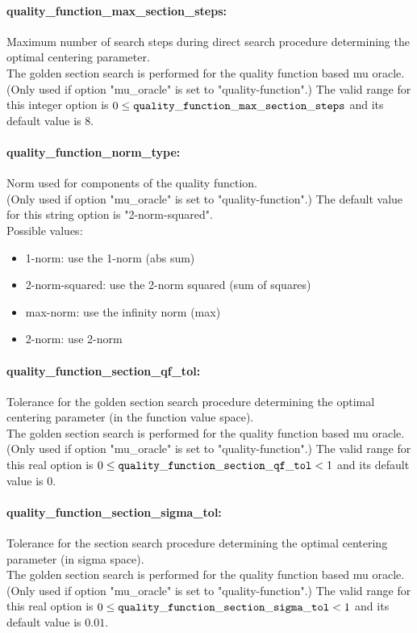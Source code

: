 \paragraph{quality\_function\_max\_section\_steps:}\label{sec:quality_function_max_section_steps} Maximum number of search steps during direct search procedure determining the optimal centering parameter. $\;$ \\
 The golden section search is performed for the
quality function based mu oracle. (Only used if
option "mu\_oracle" is set to "quality-function".) The valid range for this integer option is
$0 \le {\tt quality\_function\_max\_section\_steps }$
and its default value is $8$.


\paragraph{quality\_function\_norm\_type:}\label{sec:quality_function_norm_type} Norm used for components of the quality function. $\;$ \\
 (Only used if option "mu\_oracle" is set to
"quality-function".)
The default value for this string option is "2-norm-squared".
\\ 
Possible values:
\begin{itemize}
   \item 1-norm: use the 1-norm (abs sum)
   \item 2-norm-squared: use the 2-norm squared (sum of squares)
   \item max-norm: use the infinity norm (max)
   \item 2-norm: use 2-norm
\end{itemize}

\paragraph{quality\_function\_section\_qf\_tol:}\label{sec:quality_function_section_qf_tol} Tolerance for the golden section search procedure determining the optimal centering parameter (in the function value space). $\;$ \\
 The golden section search is performed for the
quality function based mu oracle. (Only used if
option "mu\_oracle" is set to "quality-function".) The valid range for this real option is 
$0 \le {\tt quality\_function\_section\_qf\_tol } <  1$
and its default value is $0$.


\paragraph{quality\_function\_section\_sigma\_tol:}\label{sec:quality_function_section_sigma_tol} Tolerance for the section search procedure determining the optimal centering parameter (in sigma space). $\;$ \\
 The golden section search is performed for the
quality function based mu oracle. (Only used if
option "mu\_oracle" is set to "quality-function".) The valid range for this real option is 
$0 \le {\tt quality\_function\_section\_sigma\_tol } <  1$
and its default value is $0.01$.


